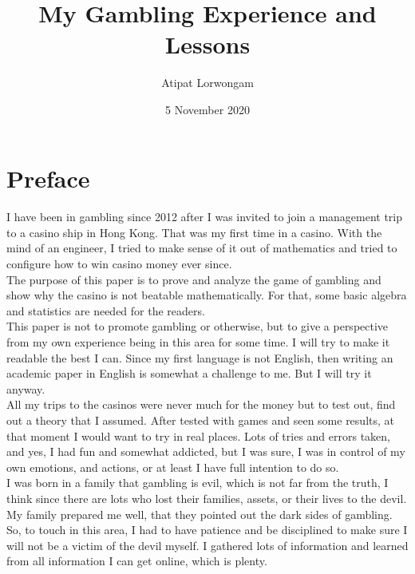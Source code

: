 \documentclass{article}
\title{My Gambling Experience and Lessons}
\author{Atipat Lorwongam}
\date{5 November 2020}
\begin{document}
\pagecolor{lightyellow}
\maketitle
\tableofcontents
\newpage

\clearpage
\section{Preface}
\paragraph{ }
I have been in gambling since 2012 after I was invited to join a management trip to a casino ship in Hong Kong.  That was my first time in a casino.  With the mind of an engineer,  I tried to make sense of it out of mathematics and tried to configure how to win casino money ever since.\\
	
The purpose of this paper is to prove and analyze the game of gambling and show why the casino is not beatable mathematically.  For that, some basic algebra and statistics are needed for the readers.\\
	
This paper is not to promote gambling or otherwise, but to give a perspective from my own experience being in this area for some time.  I will try to make it readable the best I can.  Since my first language is not English, then writing an academic paper in English is somewhat a challenge to me.  But I will try it anyway.  \\

	All my trips to the casinos were never much for the money but to test out, find out a theory that I assumed.  After tested with games and seen some results, at that moment I would want to try in real places.  Lots of tries and errors taken, and yes, I had fun and somewhat addicted, but I was sure, I was in control of my own emotions, and actions, or at least I have full intention to do so.\\
	
	I was born in a family that gambling is evil, which is not far from the truth, I think since there are lots who lost their families, assets, or their lives to the devil.  My family prepared me well, that they pointed out the dark sides of gambling.  So, to touch in this area, I had to have patience and be disciplined to make sure I will not be a victim of the devil myself.  I gathered lots of information and learned from all information I can get online, which is plenty. \\
	
\end{document}

